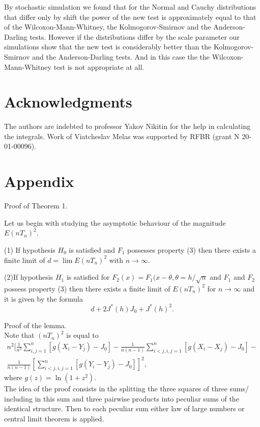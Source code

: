 \documentclass{svproc}
\begin{document}
By stochastic simulation we found that for the Normal and Cauchy distributions that differ only by shift the power of the new test is approximately equal to that of the Wilcoxon-Mann-Whitney, the Kolmogorov-Smirnov and the Anderson-Darling tests. However if the distributions differ by the scale parameter our simulations show that the new test is considerably better than the Kolmogorov-Smirnov and the Anderson-Darling tests. And in this case the the Wilcoxon-Mann-Whitney test is not appropriate at all.

\section*{Acknowledgments}
The authors are indebted to professor Yakov Nikitin for the help in calculating the  integrals. Work of Viatcheslav Melas was supported by RFBR (grant N 20-01-00096).

\section{Appendix}
Proof of Theorem 1.

Let us begin with studying the asymptotic behaviour of the magnitude $E(nT_n)^2$.

\begin{lemma}
(1) If hypothesis $H_0$ is satisfied and $F_1$ possesses property (3) then there exists a finite limit of $d=\lim E(nT_n)^2$ with $n \to \infty.$

(2)If hypothesis $H_1$ is satisfied for $F_2(x)= F_1(x-\theta,\theta= h/\sqrt{n}$ and $F_1$ and $F_2$ possess property (3)  then there exists a finite  limit of $E(nT_n)^2$ for $n \to \infty$ and it is given by the formula
$$
d + 2J^*(h)J_0 + J^*(h)^2.
$$
\end{lemma}
Proof of the lemma.\\
Note that $(nT_n)^2$ is equal to
\begin{eqnarray*}
n^2 [\frac{1}{n^2}\sum_{i,j=1}^n [g(X_i - Y_j)-J_0]-\frac{1}{ n(n-1)}\sum_{i<j,i,j=1}^n  [g(X_i - X_j)-J_0] - \\ \frac{1}{n(n-1)}[\sum_{i<j,i,j=1}^n  [g(Y_i - Y_j)-J_0]]^2,
\end{eqnarray*}
where $g(z)= \ln(1+z^2).$\\
The idea of the proof consists in the splitting the three squares of three sums/ including in this sum and three
pairwise products into peculiar sums of the identical structure.
Then to each peculiar sum either law of large numbers or central limit theorem is applied.\\
\end{document}

